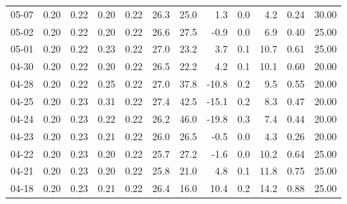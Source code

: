 \begin{threeparttable}
{\begin{tabular}{lrrrrrrrrrrr}
  05-07 &          0.20 &          0.22 &          0.20 &        0.22 &                26.3 &                25.0 &        1.3 &                 0.0 &              4.2 &            0.24 &                  30.00 \\
  05-02 &          0.20 &          0.22 &          0.20 &        0.22 &                26.6 &                27.5 &       -0.9 &                 0.0 &              6.9 &            0.40 &                  25.00 \\
  05-01 &          0.20 &          0.22 &          0.23 &        0.22 &                27.0 &                23.2 &        3.7 &                 0.1 &             10.7 &            0.61 &                  25.00 \\
  04-30 &          0.20 &          0.22 &          0.20 &        0.22 &                26.5 &                22.2 &        4.2 &                 0.1 &             10.1 &            0.60 &                  20.00 \\
  04-28 &          0.20 &          0.22 &          0.25 &        0.22 &                27.0 &                37.8 &      -10.8 &                 0.2 &              9.5 &            0.55 &                  20.00 \\
  04-25 &          0.20 &          0.23 &          0.31 &        0.22 &                27.4 &                42.5 &      -15.1 &                 0.2 &              8.3 &            0.47 &                  20.00 \\
  04-24 &          0.20 &          0.23 &          0.22 &        0.22 &                26.2 &                46.0 &      -19.8 &                 0.3 &              7.4 &            0.44 &                  20.00 \\
  04-23 &          0.20 &          0.23 &          0.21 &        0.22 &                26.0 &                26.5 &       -0.5 &                 0.0 &              4.3 &            0.26 &                  20.00 \\
  04-22 &          0.20 &          0.23 &          0.20 &        0.22 &                25.7 &                27.2 &       -1.6 &                 0.0 &             10.2 &            0.64 &                  25.00 \\
  04-21 &          0.20 &          0.23 &          0.20 &        0.22 &                25.8 &                21.0 &        4.8 &                 0.1 &             11.8 &            0.75 &                  25.00 \\
  04-18 &          0.20 &          0.23 &          0.21 &        0.22 &                26.4 &                16.0 &       10.4 &                 0.2 &             14.2 &            0.88 &                  25.00 \\

\end{tabular}}
\end{threeparttable}
